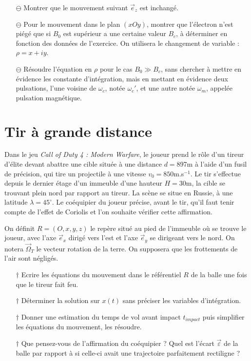 \documentclass{report}
\begin{document}
\begin{itemize}

		\item[$\ominus$] Montrer que le mouvement suivant $\vec{e}_z$ est inchangé.
		
		\item[$\ominus$] Pour le mouvement dans le plan $(xOy)$, montrer que l'électron n'est piégé que si $B_0$ est supérieur a une certaine valeur $B_c$, à déterminer en fonction des données de l'exercice. On utilisera le changement de variable : $\rho = x+iy$.
		
		\item[$\ominus$] Résoudre l'équation en $\rho$ pour le cas $B_0\gg B_c$, sans chercher à mettre en évidence les constante d'intégration, mais en mettant en évidence deux pulsations, l'une voisine de $\omega_c$, notée $\omega_c'$, et une autre notée $\omega_m$, appelée pulsation magnétique. 
		
\end{itemize}

\newpage

\section*{Tir à grande distance}

Dans le jeu \textit{Call of Duty 4 : Modern Warfare}, le joueur prend le rôle d'un tireur d'élite devant abattre une cible située à une distance $d=$897m à l'aide d'un fusil de précision, qui tire un projectile à une vitesse $v_0=850$m.s$^{-1}$. Le tir s'effectue depuis le dernier étage d'un immeuble d'une hauteur $H=30$m, la cible se trouvant plein nord par rapport au tireur. La scène se situe en Russie, à une latitude $\lambda=45^\circ$. Le coéquipier du joueur précise, avant le tir, qu'il faut tenir compte de l'effet de Coriolis et l'on souhaite vérifier cette affirmation.

On définit $R=(O,x,y,z)$ le repère situé au pied de l'immeuble où se trouve le joueur, avec l'axe $\vec{e}_x$ dirigé vers l'est et l'axe $\vec{e}_y$ se dirigeant vers le nord. On notera $\vec{\Omega}_T$ le vecteur rotation de la terre. On supposera que les frottements de l'air sont négligés.

\begin{itemize}

	\item[$\dagger$] Ecrire les équations du mouvement dans le référentiel $R$ de la balle une fois que le tireur fait feu.
	
	\item[$\dagger$] Déterminer la solution sur $x(t)$ sans préciser les variables d'intégration.
	
	\item[$\dagger$] Donner une estimation du temps de vol avant impact $t_{impact}$ puis simplifier les équations du mouvement, les résoudre.
	
	\item[$\dagger$] Que pensez-vous de l'affirmation du coéquipier ? Quel est l'écart $\vec{\varepsilon}$ de la balle par rapport à si celle-ci avait une trajectoire parfaitement rectiligne ?

\end{itemize}
\end{document}
